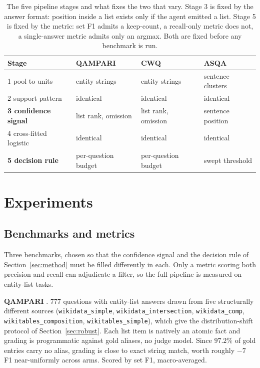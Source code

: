 \documentclass{article}
\begin{document}
\begin{table}[t]
  \caption{The five pipeline stages and what fixes the two that vary. Stage 3 is fixed by the answer format: position inside a list exists only if the agent emitted a list. Stage 5 is fixed by the metric: set F1 admits a keep-count, a recall-only metric does not, a single-answer metric admits only an argmax. Both are fixed before any benchmark is run.}
  \label{tab:slots}
  \centering
  \begin{tabular}{llll}
    \toprule
    Stage & QAMPARI & CWQ & ASQA \\
    \midrule
    1 pool to units       & entity strings   & entity strings & sentence clusters  \\
    2 support pattern     & identical        & identical      & identical          \\
    \textbf{3 confidence signal} & list rank, omission & list rank, omission & sentence position \\
    4 cross-fitted logistic & identical      & identical      & identical          \\
    \textbf{5 decision rule}     & per-question budget & per-question budget & swept threshold \\
    \bottomrule
  \end{tabular}
\end{table}


\section{Experiments}
\label{sec:experiments}

\subsection{Benchmarks and metrics}
\label{sec:metrics}

Three benchmarks, chosen so that the confidence signal and the decision rule of Section~\ref{sec:method} must be filled differently in each. Only a metric scoring both precision and recall can adjudicate a filter, so the full pipeline is measured on entity-list tasks.

\textbf{QAMPARI} \cite{amouyal2022qampari}. 777 questions with entity-list answers drawn from five structurally different sources (\texttt{wikidata\_simple}, \texttt{wikidata\_intersection}, \texttt{wikidata\_comp}, \texttt{wikitables\_composition}, \texttt{wikitables\_simple}), which give the distribution-shift protocol of Section~\ref{sec:robust}.
Each list item is natively an atomic fact and grading is programmatic against gold aliases, no judge model. Since $97.2\%$ of gold entries carry no alias, grading is close to exact string match, worth roughly $-7$ F1 near-uniformly across arms. Scored by set F1, macro-averaged.
\end{document}
